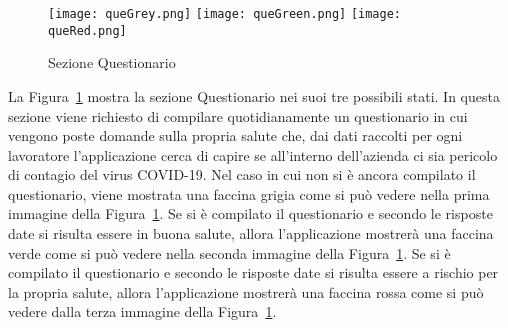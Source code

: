\begin{trivlist}
	\begin{figure}[h]
		\centering
		\texttt{[image: queGrey.png]}\hfill
		\texttt{[image: queGreen.png]}\hfill
		\texttt{[image: queRed.png]}
		\caption{Sezione Questionario}\label{fig:que}
	\end{figure}
	
	La Figura~\ref{fig:que} mostra la sezione Questionario nei suoi tre possibili stati. In questa sezione viene richiesto di compilare quotidianamente un questionario in cui vengono poste domande sulla propria salute che, dai dati raccolti per ogni lavoratore l'applicazione cerca di capire se all'interno dell'azienda ci sia pericolo di contagio del virus COVID-19. Nel caso in cui non si è ancora compilato il questionario, viene mostrata una faccina grigia come si può vedere nella prima immagine della Figura~\ref{fig:que}. Se si è compilato il questionario e secondo le risposte date si risulta essere in buona salute, allora l'applicazione mostrerà una faccina verde come si può vedere nella seconda immagine della Figura~\ref{fig:que}. Se si è compilato il questionario e secondo le risposte date si risulta essere a rischio per la propria salute, allora l'applicazione mostrerà una faccina rossa come si può vedere dalla terza immagine della Figura~\ref{fig:que}.
	

\end{trivlist}
